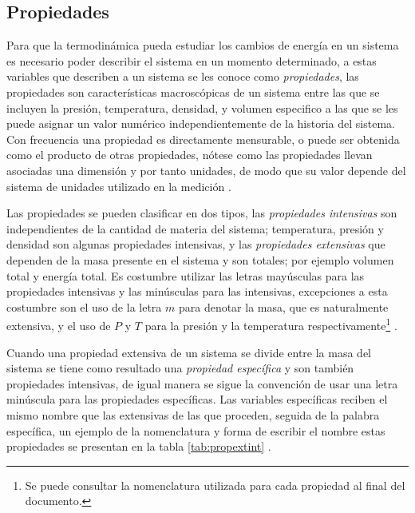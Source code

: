 \documentclass[../master.tex]{subfiles}
\begin{document}
\subsection{Propiedades}

Para que la termodinámica pueda estudiar los cambios de energía en un sistema es necesario poder describir el sistema en un momento determinado, a estas variables que describen a un sistema se les conoce como \emph{propiedades}, las propiedades son características macroscópicas de un sistema entre las que se incluyen la presión, temperatura, densidad, y volumen especifico a las que se les puede asignar un valor numérico independientemente de la historia del sistema. Con frecuencia una propiedad es directamente mensurable, o puede ser obtenida como el producto de otras propiedades, nótese como las propiedades llevan asociadas una dimensión y por tanto unidades, de modo que su valor depende del sistema de unidades utilizado en la medición \parencites{moranshapiro}{faires}{wark}.

Las propiedades se pueden clasificar en dos tipos, las \emph{propiedades intensivas} son independientes de la cantidad de materia del sistema; temperatura, presión y densidad son algunas propiedades intensivas, y las \emph{propiedades extensivas} que dependen de la masa presente en el sistema y son totales; por ejemplo volumen total y energía total. Es costumbre utilizar las letras mayúsculas para las propiedades intensivas y las minúsculas para las intensivas, excepciones a esta costumbre son el uso de la letra \( m \) para denotar la masa, que es naturalmente extensiva, y el uso de \( P \) y \( T \) para la presión y la temperatura respectivamente\footnote{Se puede consultar la nomenclatura utilizada para cada propiedad al final del documento.} \parencites{wark}{faires}{cengelt}.

Cuando una propiedad extensiva de un sistema se divide entre la masa del sistema se tiene como resultado una \emph{propiedad específica} y son también propiedades intensivas, de igual manera se sigue la convención de usar una letra minúscula para las propiedades específicas. Las variables específicas reciben el mismo nombre que las extensivas de las que proceden, seguida de la palabra específica, un ejemplo de la nomenclatura y forma de escribir el nombre estas propiedades se presentan en la tabla \ref{tab:propextint} \parencite{wark}.
\end{document}
